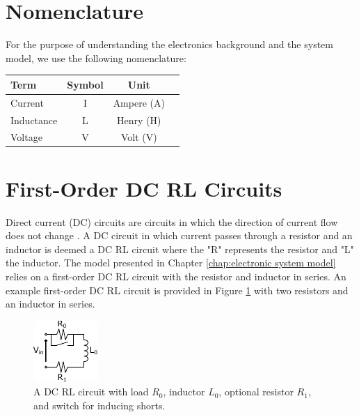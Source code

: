 \documentclass[11pt,compsoc,oneside]{report}
\begin{document}
\section{Nomenclature}
For the purpose of understanding the electronics background and the system model, we use the following nomenclature:

\begin{center}
\bgroup
\def\arraystretch{1.25}%
\begin{tabular}{| l | c | c | c |}
  \hline			
  Term & Symbol & Unit\\  \hline \hline \cline{1-3}
  Current & I & Ampere (A)\\ \cline{1-3}
  Inductance & L & Henry (H)\\ \cline{1-3}
  Voltage & V & Volt (V)\\ \cline{1-3}
  \hline  
\end{tabular}
\egroup
\end{center}

\section{First-Order DC RL Circuits}
Direct current (DC) circuits are circuits in which the direction of current flow does not change \cite{uniphy}. A DC circuit in which current passes through a resistor and an inductor is deemed a DC RL circuit where the "R" represents the resistor and "L" the inductor. The model presented in Chapter \ref{chap:electronic system model} relies on a first-order DC RL circuit with the resistor and inductor in series. An example first-order DC RL circuit is provided in Figure \ref{fig:ModelDCRL} with two resistors and an inductor in series.
\begin{figure}
	\centering
    \includegraphics[width=0.25\linewidth]{img/Model_DC_RL_Circuit_General.pdf}
    \caption{A DC RL circuit with load $R_0$, inductor $L_0$, optional resistor $R_1$, and switch for inducing shorts.}
    \label{fig:ModelDCRL}
\end{figure}
\end{document}
